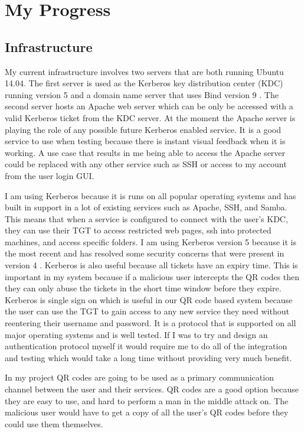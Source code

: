\documentclass[]{report}   %
\begin{document}
\section{My Progress}
\subsection{Infrastructure} 
My current infrastructure involves two servers that are both running Ubuntu 14.04. The first server is used as the Kerberos key distribution center (KDC) running version 5 and a domain name server that uses Bind version 9 \cite{Bind}. The second server hosts an Apache web server which can be only be accessed with a valid Kerberos ticket from the KDC server. At the moment the Apache server is playing the role of any possible future Kerberos enabled service. It is a good service to use when testing because there is instant visual feedback when it is working. A use case that results in me being able to access the Apache server could be replaced with any other service such as SSH or access to my account from the user login GUI.

I am using Kerberos because it is runs on all popular operating systems and has built in support in a lot of existing services such as Apache, SSH, and Samba. This means that when a service is configured to connect with the user's KDC, they can use their TGT to access restricted web pages, ssh into protected machines, and access specific folders. I am using Kerberos version 5 because it is the most recent and has resolved some security concerns that were present in version 4 \cite{KerbUpdate}. Kerberos is also useful because all tickets have an expiry time. This is important in my system because if a malicious user intercepts the QR codes then they can only abuse the tickets in the short time window before they expire. Kerberos is single sign on which is useful in our QR code based system because the user can use the TGT to gain access to any new service they need without reentering their username and password. It is a protocol that is supported on all major operating systems and is well tested. If I was to try and design an authentication protocol myself it would require me to do all of the integration and testing which would take a long time without providing very much benefit.

In my project QR codes are going to be used as a primary communication channel between the user and their services. QR codes are a good option because they are easy to use, and hard to perform a man in the middle attack on. The malicious user would have to get a copy of all the user's QR codes before they could use them themselves.
\end{document}
